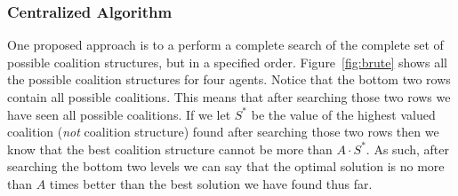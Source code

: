 \subsubsection{Centralized Algorithm}
\begin{SCfigure}
  \begin{minipage}{1.0\linewidth}
  \begin{center}
  \end{center}
  \end{minipage}
  \caption{Coalition structure formation possibilities for four
    agents, organized by the number of coalitions.}
  \label{fig:brute}
\end{SCfigure}

One proposed approach is to a perform a complete search of the
complete set of possible coalition structures, but in a specified
order. Figure~\ref{fig:brute} shows all the possible coalition
structures for four agents. Notice that the bottom two rows contain
all possible coalitions. This means that after searching those two
rows we have seen all possible coalitions. If we let $S^*$ be the
value of the highest valued coalition (\emph{not} coalition structure)
found after searching those two rows then we know that the best
coalition structure cannot be more than $A\cdot S^*$. As such, after
searching the bottom two levels we can say that the optimal solution
is no more than $A$ times better than the best solution we have found
thus far.

